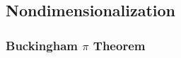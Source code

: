 
\subsection{Nondimensionalization}\label{sec:nondimensionalization}

\subsubsection{Buckingham $\pi$ Theorem}\label{sec:buckingham_pi}
